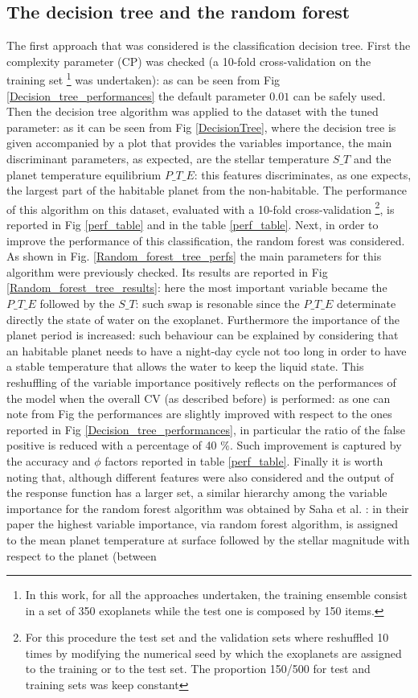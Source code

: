 \documentclass[
12pt, %
a4paper, %
oneside, %
headinclude,footinclude, %
BCOR5mm, %
]{scrartcl}
\begin{document}
\clearpage

\subsection{The decision tree and the random forest}
The first approach that was considered is the classification decision tree. First the complexity parameter (CP) was checked (a 10-fold cross-validation on the training set \footnote{In this work, for all the approaches undertaken, the training ensemble consist in a set of 350 exoplanets while the test one is composed by 150 items. } was undertaken): as can be seen from Fig \ref{Decision_tree_performances} the default parameter $0.01$ can be safely used. Then the decision tree algorithm was applied to the dataset with the tuned parameter: as it can be seen from Fig \ref{DecisionTree}, where the decision tree is given accompanied by a plot that provides the variables importance,  the main discriminant parameters, as expected, are the stellar temperature $S\_T$ and the planet temperature equilibrium $P\_T\_E$: this features discriminates, as one expects, the largest part of the habitable planet from the non-habitable. The performance of this algorithm on this dataset, evaluated with a 10-fold cross-validation \footnote{For this procedure the test set and the validation sets where reshuffled 10 times by modifying the numerical seed by which the exoplanets are assigned to the training or to the test set. The proportion 150/500 for test and training sets was keep constant}, is reported in Fig \ref{perf_table} and in the table \ref{perf_table}. Next, in order to improve the performance of this classification, the random forest was considered. As shown in Fig. \ref{Random_forest_tree_perfs} the main parameters for this algorithm were previously checked. Its results are reported in Fig \ref{Random_forest_tree_results}: here the most important variable became the $P\_T\_E$ followed by the $S\_T$: such swap is resonable since the $P\_T\_E$ determinate directly the state of water on the exoplanet. Furthermore the importance of the planet period is increased: such behaviour can be explained by considering that an habitable planet needs  to have a night-day cycle not too long in order to have a stable temperature that allows the water to keep the liquid state.  This reshuffling of the variable importance positively reflects on the performances of the model when the overall CV (as described before) is performed: as one can note from Fig the performances are slightly improved with respect to the ones reported in Fig \ref{Decision_tree_performances}, in particular the ratio of the false positive is reduced with a percentage of 40 $\%$. Such improvement is captured by the accuracy and $\phi$ factors reported in table \ref{perf_table}. Finally it is worth noting that, although  different features were also considered and the output of the response function has a larger set,  a similar hierarchy  among the variable importance for the random forest algorithm was obtained by Saha et al. \cite{saha2018machine}: in their paper the highest variable importance, via random forest algorithm,  is assigned to the mean planet temperature at surface followed by the stellar magnitude with respect to the planet (between 
\end{document}
